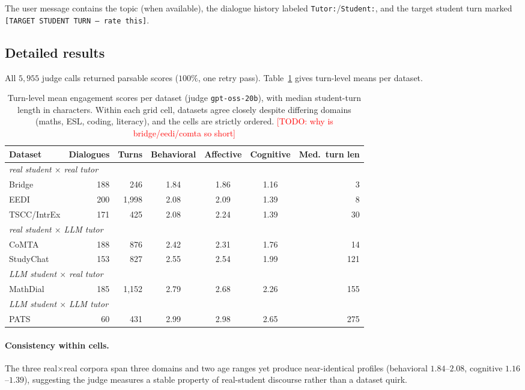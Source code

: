 \documentclass[11pt]{article}
\newcommand{\todo}[1]{\textcolor{red}{[TODO: #1]}}
\begin{document}
The user message contains the topic (when available), the dialogue history
labeled \texttt{Tutor:}/\texttt{Student:}, and the target student turn
marked \texttt{[TARGET STUDENT TURN -- rate this]}.

\subsection{Detailed results}
\label{app:judge-results}

All $5{,}955$ judge calls returned parsable scores ($100\%$, one retry
pass). Table~\ref{tab:judge-perdataset} gives turn-level means per dataset.

\begin{table}[h]
\centering
\small
\begin{tabular}{lrrcccr}
\toprule
Dataset & Dialogues & Turns & Behavioral & Affective & Cognitive &
Med.\ turn len \\
\midrule
\multicolumn{7}{l}{\emph{real student $\times$ real tutor}}\\
Bridge      & 188 & 246   & 1.84 & 1.86 & 1.16 & 3 \\
EEDI        & 200 & 1{,}998 & 2.08 & 2.09 & 1.39 & 8 \\
TSCC/IntrEx & 171 & 425   & 2.08 & 2.24 & 1.39 & 30 \\
\multicolumn{7}{l}{\emph{real student $\times$ LLM tutor}}\\
CoMTA       & 188 & 876   & 2.42 & 2.31 & 1.76 & 14 \\
StudyChat   & 153 & 827   & 2.55 & 2.54 & 1.99 & 121 \\
\multicolumn{7}{l}{\emph{LLM student $\times$ real tutor}}\\
MathDial    & 185 & 1{,}152 & 2.79 & 2.68 & 2.26 & 155 \\
\multicolumn{7}{l}{\emph{LLM student $\times$ LLM tutor}}\\
PATS        & 60  & 431   & 2.99 & 2.98 & 2.65 & 275 \\
\bottomrule
\end{tabular}
\caption{Turn-level mean engagement scores per dataset (judge
\texttt{gpt-oss-20b}), with median student-turn length in characters.
Within each grid cell, datasets agree closely despite differing domains
(maths, ESL, coding, literacy), and the cells are strictly ordered. \todo{why is bridge/eedi/comta so short}}
\label{tab:judge-perdataset}
\end{table}

\paragraph{Consistency within cells.} The three real$\times$real corpora
span three domains and two age ranges yet produce near-identical profiles
(behavioral $1.84$--$2.08$, cognitive $1.16$--$1.39$), suggesting the judge
measures a stable property of real-student discourse rather than a dataset
quirk.
\end{document}
